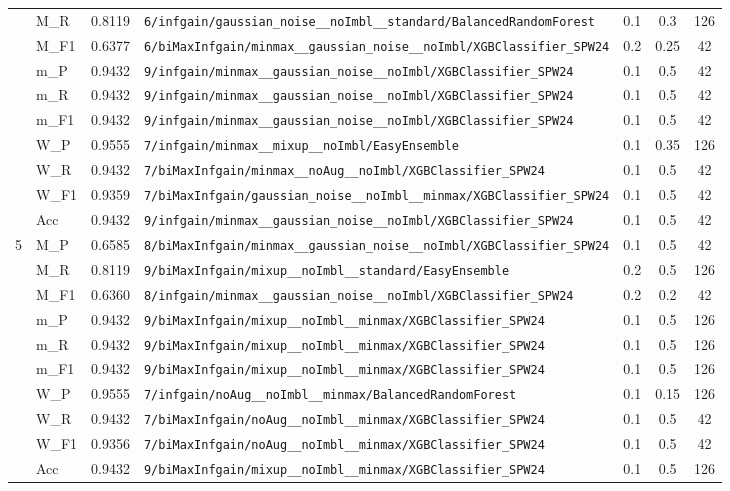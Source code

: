 \begin{table}[htbp]
\begin{tabular}{|c|l|c|>{\ttfamily\footnotesize}p{7.2cm}|c|c|c|}
 & M\_R & 0.8119 & \texttt{6/infgain/gaussian\_noise\_\_noImbl\_\_standard/BalancedRandomForest} & 0.1 & 0.3  & 126 \\ 
 & M\_F1 & 0.6377 & \texttt{6/biMaxInfgain/minmax\_\_gaussian\_noise\_\_noImbl/XGBClassifier\_SPW24} & 0.2 & 0.25  & 42 \\ 
 & m\_P & 0.9432 & \texttt{9/infgain/minmax\_\_gaussian\_noise\_\_noImbl/XGBClassifier\_SPW24} & 0.1 & 0.5  & 42 \\ 
 & m\_R & 0.9432 & \texttt{9/infgain/minmax\_\_gaussian\_noise\_\_noImbl/XGBClassifier\_SPW24} & 0.1 & 0.5  & 42 \\ 
 & m\_F1 & 0.9432 & \texttt{9/infgain/minmax\_\_gaussian\_noise\_\_noImbl/XGBClassifier\_SPW24} & 0.1 & 0.5  & 42 \\ 
 & W\_P & 0.9555 & \texttt{7/infgain/minmax\_\_mixup\_\_noImbl/EasyEnsemble} & 0.1 & 0.35  & 126 \\ 
 & W\_R & 0.9432 & \texttt{7/biMaxInfgain/minmax\_\_noAug\_\_noImbl/XGBClassifier\_SPW24} & 0.1 & 0.5  & 42 \\ 
 & W\_F1 & 0.9359 & \texttt{7/biMaxInfgain/gaussian\_noise\_\_noImbl\_\_minmax/XGBClassifier\_SPW24} & 0.1 & 0.5  & 42 \\ 
 & Acc & 0.9432 & \texttt{9/infgain/minmax\_\_gaussian\_noise\_\_noImbl/XGBClassifier\_SPW24} & 0.1 & 0.5  & 42 \\ 
\hline
\multirow{10}{*}{5} & M\_P & 0.6585 & \texttt{8/biMaxInfgain/minmax\_\_gaussian\_noise\_\_noImbl/XGBClassifier\_SPW24} & 0.1 & 0.5  & 42 \\ 
 & M\_R & 0.8119 & \texttt{9/biMaxInfgain/mixup\_\_noImbl\_\_standard/EasyEnsemble} & 0.2 & 0.5  & 126 \\ 
 & M\_F1 & 0.6360 & \texttt{8/infgain/minmax\_\_gaussian\_noise\_\_noImbl/XGBClassifier\_SPW24} & 0.2 & 0.2  & 42 \\ 
 & m\_P & 0.9432 & \texttt{9/biMaxInfgain/mixup\_\_noImbl\_\_minmax/XGBClassifier\_SPW24} & 0.1 & 0.5  & 126 \\ 
 & m\_R & 0.9432 & \texttt{9/biMaxInfgain/mixup\_\_noImbl\_\_minmax/XGBClassifier\_SPW24} & 0.1 & 0.5  & 126 \\ 
 & m\_F1 & 0.9432 & \texttt{9/biMaxInfgain/mixup\_\_noImbl\_\_minmax/XGBClassifier\_SPW24} & 0.1 & 0.5  & 126 \\ 
 & W\_P & 0.9555 & \texttt{7/infgain/noAug\_\_noImbl\_\_minmax/BalancedRandomForest} & 0.1 & 0.15  & 126 \\ 
 & W\_R & 0.9432 & \texttt{7/biMaxInfgain/noAug\_\_noImbl\_\_minmax/XGBClassifier\_SPW24} & 0.1 & 0.5  & 42 \\ 
 & W\_F1 & 0.9356 & \texttt{7/biMaxInfgain/noAug\_\_noImbl\_\_minmax/XGBClassifier\_SPW24} & 0.1 & 0.5  & 42 \\ 
 & Acc & 0.9432 & \texttt{9/biMaxInfgain/mixup\_\_noImbl\_\_minmax/XGBClassifier\_SPW24} & 0.1 & 0.5  & 126 \\ 
\hline
\end{tabular}
\end{table}